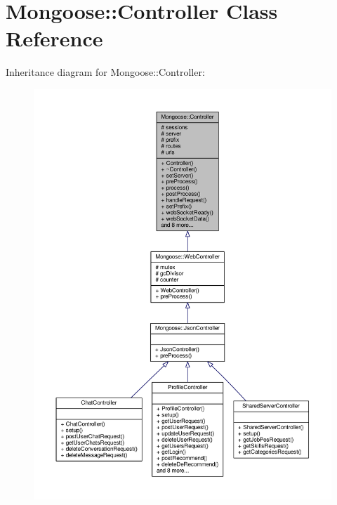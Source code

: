 \hypertarget{classMongoose_1_1Controller}{}\section{Mongoose\+:\+:Controller Class Reference}
\label{classMongoose_1_1Controller}


Inheritance diagram for Mongoose\+:\+:Controller\+:
\nopagebreak
\begin{figure}[H]
\begin{center}
\leavevmode
\includegraphics[width=350pt]{d8/dd0/classMongoose_1_1Controller__inherit__graph}
\end{center}
\end{figure}


